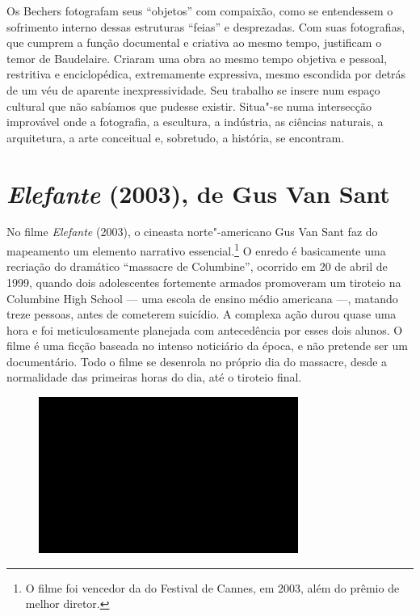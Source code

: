 Os Bechers fotografam seus ``objetos'' com compaixão, como se
entendessem o sofrimento interno dessas estruturas ``feias'' e
desprezadas. Com suas fotografias, que cumprem a função documental e
criativa ao mesmo tempo, justificam o temor de Baudelaire. Criaram uma
obra ao mesmo tempo objetiva e pessoal, restritiva e enciclopédica,
extremamente expressiva, mesmo escondida por detrás de um véu de
aparente inexpressividade. Seu trabalho se insere num espaço cultural
que não sabíamos que pudesse existir. Situa"-se numa intersecção
improvável onde a fotografia, a escultura, a indústria, as ciências
naturais, a arquitetura, a arte conceitual e, sobretudo, a história, se
encontram.

\chapter{\emph{Elefante} (2003), de Gus Van Sant}

No filme \emph{Elefante} (2003), o cineasta norte"-americano Gus Van Sant
faz do mapeamento um elemento narrativo essencial.\footnote{O filme foi
  vencedor da {} do Festival de Cannes, em 2003, além
  do prêmio de melhor diretor.} O enredo é basicamente uma recriação do
dramático ``massacre de Columbine'', ocorrido em 20 de abril de 1999,
quando dois adolescentes fortemente armados promoveram um tiroteio na
Columbine High School --- uma escola de ensino médio americana ---,
matando treze pessoas, antes de cometerem suicídio. A complexa ação
durou quase uma hora e foi meticulosamente planejada com antecedência
por esses dois alunos. O filme é uma ficção baseada no intenso
noticiário da época, e não pretende ser um documentário. Todo o filme se
desenrola no próprio dia do massacre, desde a normalidade das primeiras
horas do dia, até o tiroteio final.

\begin{figure}[!ht]
\centering
 \includegraphics[width=85mm]{./imgs/im1.jpg}
\caption{\tiny{}}
\end{figure}

